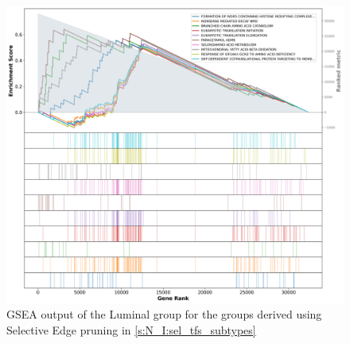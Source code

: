 \begin{figure}[!htb]
    \centering
    \includegraphics[width=\textwidth,keepaspectratio]{Sections/Network_I/Resources/selective_pruning/gsea/largeLuminal_10_top_manTerms.png}
    \caption{GSEA output of the Luminal group for the groups derived using Selective Edge pruning in  \cref{s:N_I:sel_tfs_subtypes}}
    \label{fig:ap:gsea_largeLuminal}
\end{figure}


